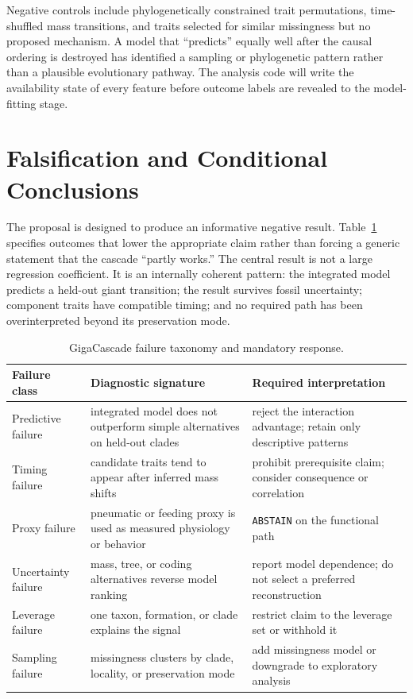\documentclass[conference]{IEEEtran}
\newcommand{\gc}{GigaCascade}
\newcommand{\abstain}{\texttt{ABSTAIN}}
\begin{document}
Negative controls include phylogenetically constrained trait permutations, time-shuffled mass transitions, and traits selected for similar missingness but no proposed mechanism. A model that ``predicts'' equally well after the causal ordering is destroyed has identified a sampling or phylogenetic pattern rather than a plausible evolutionary pathway. The analysis code will write the availability state of every feature before outcome labels are revealed to the model-fitting stage.

\section{Falsification and Conditional Conclusions}

The proposal is designed to produce an informative negative result. Table~\ref{tab:failure} specifies outcomes that lower the appropriate claim rather than forcing a generic statement that the cascade ``partly works.'' The central result is not a large regression coefficient. It is an internally coherent pattern: the integrated model predicts a held-out giant transition; the result survives fossil uncertainty; component traits have compatible timing; and no required path has been overinterpreted beyond its preservation mode.

\begin{table}[!t]
\caption{\gc{} failure taxonomy and mandatory response.}
\label{tab:failure}
\centering
\scriptsize
\begin{tabular}{|p{}|p{}|p{}|}
\hline
Failure class & Diagnostic signature & Required interpretation \\
\hline
Predictive failure & integrated model does not outperform simple alternatives on held-out clades & reject the interaction advantage; retain only descriptive patterns \\
\hline
Timing failure & candidate traits tend to appear after inferred mass shifts & prohibit prerequisite claim; consider consequence or correlation \\
\hline
Proxy failure & pneumatic or feeding proxy is used as measured physiology or behavior & \abstain{} on the functional path \\
\hline
Uncertainty failure & mass, tree, or coding alternatives reverse model ranking & report model dependence; do not select a preferred reconstruction \\
\hline
Leverage failure & one taxon, formation, or clade explains the signal & restrict claim to the leverage set or withhold it \\
\hline
Sampling failure & missingness clusters by clade, locality, or preservation mode & add missingness model or downgrade to exploratory analysis \\
\hline
\end{tabular}
\end{table}
\end{document}
